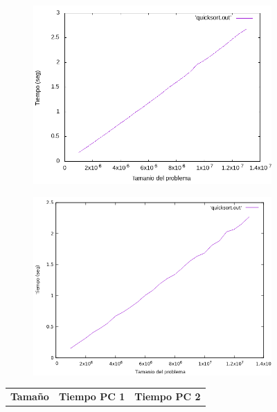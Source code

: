 \documentclass[12pt,spanish]{article}
\begin{document}
\begin{figure}[H]
\centering
\begin{subfigure}[b]{0.45\textwidth}
\includegraphics[scale=0.45]{empirica_quicksort.png}
\caption{}
\end{subfigure}
\quad
\begin{subfigure}[b]{0.45\textwidth}
\includegraphics[scale=0.45]{empirica_quicksort_2.png}
\caption{}
\end{subfigure}
\newline
\newline
\begin{tabular}{|c|c|c|}
\hline
\textbf{Tamaño} & \textbf{Tiempo PC 1} & \textbf{Tiempo PC 2} \\

\end{tabular}
\end{figure}
\end{document}
